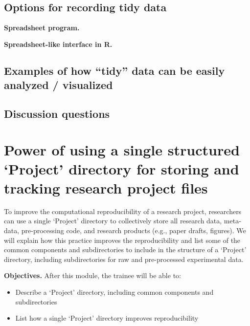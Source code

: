 \documentclass[]{tufte-book}
\providecommand{\tightlist}{%
  \setlength{\itemsep}{0pt}\setlength{\parskip}{0pt}}
\begin{document}
\hypertarget{options-for-recording-tidy-data}{%
\subsection{Options for recording tidy data}\label{options-for-recording-tidy-data}}

\textbf{Spreadsheet program.}

\textbf{Spreadsheet-like interface in R.}

\hypertarget{examples-of-how-tidy-data-can-be-easily-analyzed-visualized}{%
\subsection{Examples of how ``tidy'' data can be easily analyzed / visualized}\label{examples-of-how-tidy-data-can-be-easily-analyzed-visualized}}

\hypertarget{discussion-questions-1}{%
\subsection{Discussion questions}\label{discussion-questions-1}}

\hypertarget{power-of-using-a-single-structured-project-directory-for-storing-and-tracking-research-project-files}{%
\section{Power of using a single structured `Project' directory for storing and tracking research project files}\label{power-of-using-a-single-structured-project-directory-for-storing-and-tracking-research-project-files}}

To improve the computational reproducibility of a research project, researchers
can use a single `Project' directory to collectively store all research data,
meta-data, pre-processing code, and research products (e.g., paper drafts,
figures). We will explain how this practice improves the reproducibility and
list some of the common components and subdirectories to include in the
structure of a `Project' directory, including subdirectories for raw and
pre-processed experimental data.

\textbf{Objectives.} After this module, the trainee will be able to:

\begin{itemize}
\tightlist
\item
  Describe a `Project' directory, including common components and subdirectories
\item
  List how a single `Project' directory improves reproducibility
\end{itemize}
\end{document}
